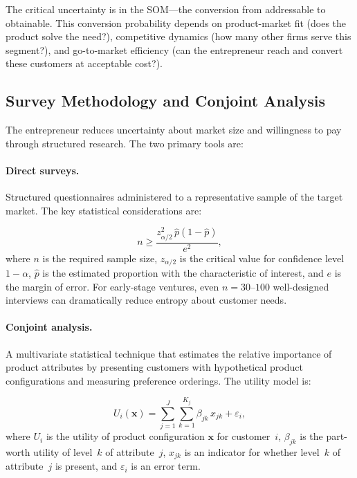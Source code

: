 \documentclass[12pt,a4paper,oneside]{book}
\theoremstyle{definition}
\theoremstyle{remark}
\begin{document}
The critical uncertainty is in the SOM---the conversion from addressable to obtainable.
This conversion probability depends on product-market fit (does the product solve the
need?), competitive dynamics (how many other firms serve this segment?), and
go-to-market efficiency (can the entrepreneur reach and convert these customers at
acceptable cost?).

\subsection{Survey Methodology and Conjoint Analysis}

The entrepreneur reduces uncertainty about market size and willingness to pay through
structured research. The two primary tools are:

\paragraph{Direct surveys.} Structured questionnaires administered to a representative
sample of the target market. The key statistical considerations are:

\begin{equation}\label{eq:sample_size}
  n \geq \frac{z^2_{\alpha/2}\,\hat{p}(1-\hat{p})}{e^2},
\end{equation}
where $n$ is the required sample size, $z_{\alpha/2}$ is the critical value for
confidence level $1-\alpha$, $\hat{p}$ is the estimated proportion with the
characteristic of interest, and $e$ is the margin of error. For early-stage ventures,
even $n = 30$--$100$ well-designed interviews can dramatically reduce entropy about
customer needs.

\paragraph{Conjoint analysis.} A multivariate statistical technique that estimates the
relative importance of product attributes by presenting customers with hypothetical
product configurations and measuring preference orderings. The utility model is:

\begin{equation}\label{eq:conjoint}
  U_i(\mathbf{x}) = \sum_{j=1}^J \sum_{k=1}^{K_j} \beta_{jk}\,x_{jk}
    + \varepsilon_i,
\end{equation}
where $U_i$ is the utility of product configuration $\mathbf{x}$ for customer~$i$,
$\beta_{jk}$ is the part-worth utility of level~$k$ of attribute~$j$, $x_{jk}$ is an
indicator for whether level~$k$ of attribute~$j$ is present, and $\varepsilon_i$ is an
error term.
\end{document}
